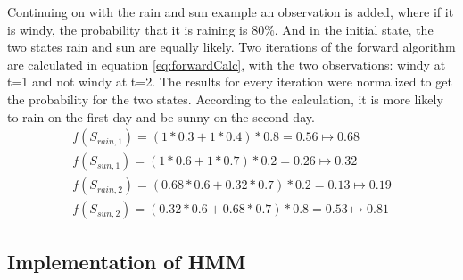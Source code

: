 \documentclass[12pt, a4paper]{article}
\begin{document}
Continuing on with the rain and sun example an observation is added, where if it is windy, the probability that it is raining is 80\%. And in the initial state, the two states rain and sun are equally likely. Two iterations of the forward algorithm are calculated in equation \ref{eq:forwardCalc}, with the two observations: windy at t=1 and not windy at t=2. The results for every iteration were normalized to get the probability for the two states. According to the calculation, it is more likely to rain on the first day and be sunny on the second day.
\begin{equation}\label{eq:forwardCalc}
\begin{split}
f(S_{rain,1}) = (1*0.3+1*0.4)*0.8 = 0.56 \mapsto 0.68
\\
f(S_{sun,1}) = (1*0.6+1*0.7)*0.2 = 0.26 \mapsto 0.32
\\
f(S_{rain,2}) = (0.68*0.6+0.32*0.7)*0.2 = 0.13 \mapsto 0.19
\\
f(S_{sun,2}) = (0.32*0.6+0.68*0.7)*0.8 = 0.53 \mapsto 0.81
\end{split}
\end{equation}





\subsection{Implementation of HMM}\label{sec:implementation}
\end{document}
